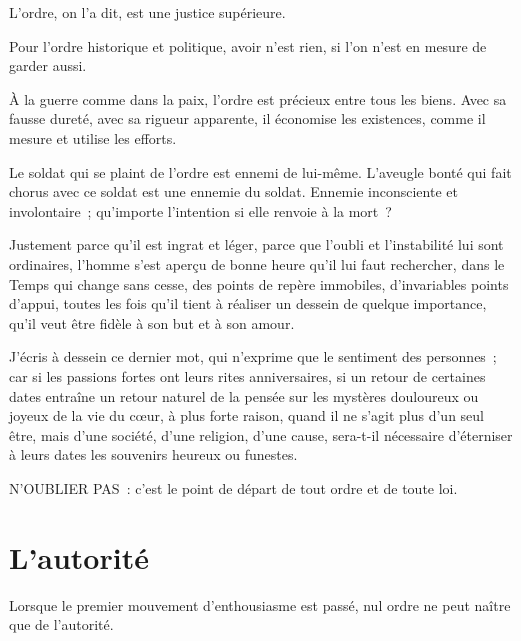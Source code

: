 \documentclass[french,twoside]{book} %
\newcommand{\astermono}{\medskip\centerline{\color{rubric}\large\selectfont{\syms ✻}}\medskip\par}%
\begin{document}
\noindent L’ordre, on l’a dit, est une justice supérieure.\par

\astermono

\noindent Pour l’ordre historique et politique, avoir n’est rien, si l’on n’est en mesure de garder aussi.\par

\astermono

\noindent À la guerre comme dans la paix, l’ordre est précieux entre tous les biens. Avec sa fausse dureté, avec sa rigueur apparente, il économise les existences, comme il mesure et utilise les efforts.\par
Le soldat qui se plaint de l’ordre est ennemi de lui-même. L’aveugle bonté qui fait chorus avec ce soldat est une ennemie du soldat. Ennemie inconsciente et involontaire ; qu’importe l’intention si elle renvoie à la mort ?\par
Justement parce qu’il est ingrat et léger, parce que l’oubli et l’instabilité lui sont ordinaires, l’homme s’est aperçu de bonne heure qu’il lui faut rechercher, dans le Temps qui change sans cesse, des points de repère immobiles, d’invariables points d’appui, toutes les fois qu’il tient à réaliser un dessein de quelque importance, qu’il veut être fidèle à son but et à son amour.\par
J’écris à dessein ce dernier mot, qui n’exprime que le sentiment des personnes ; car si les passions fortes ont leurs rites anniversaires, si un retour de certaines dates entraîne un retour naturel de la pensée sur les mystères douloureux ou joyeux de la vie du cœur, à plus forte raison, quand il ne s’agit plus d’un seul être, mais d’une société, d’une religion, d’une cause, sera-t-il nécessaire d’éterniser à leurs dates les souvenirs heureux ou funestes.\par
N’OUBLIER PAS : c’est le point de départ de tout ordre et de toute loi.
\section[{L’autorité}]{L’autorité}
\noindent Lorsque le premier mouvement d’enthousiasme est passé, nul ordre ne peut naître que de l’autorité.\par
\end{document}
